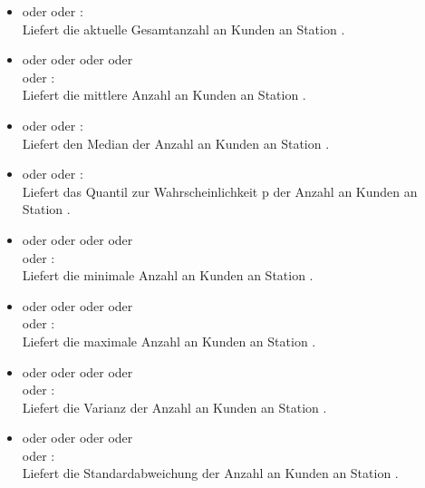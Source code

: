 \begin{itemize}

\item
{} oder  oder :\\
Liefert die aktuelle Gesamtanzahl an Kunden an Station .

\item
{} oder  oder  oder  oder\\
 oder :\\
Liefert die mittlere Anzahl an Kunden an Station .

\item
{} oder  oder :\\
Liefert den Median der Anzahl an Kunden an Station .

\item
{} oder  oder :\\
Liefert das Quantil zur Wahrscheinlichkeit p der Anzahl an Kunden an Station .

\item
{} oder  oder  oder  oder\\
 oder :\\
Liefert die minimale Anzahl an Kunden an Station .

\item
{} oder  oder  oder  oder\\
 oder :\\
Liefert die maximale Anzahl an Kunden an Station .

\item
{} oder  oder  oder  oder\\
 oder :\\
Liefert die Varianz der Anzahl an Kunden an Station .

\item
{} oder  oder  oder  oder\\
 oder :\\
Liefert die Standardabweichung der Anzahl an Kunden an Station .


\end{itemize}
